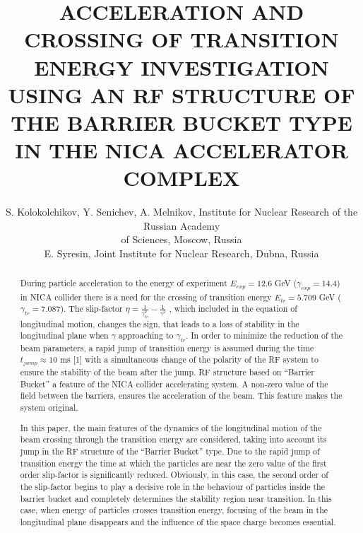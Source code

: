 \documentclass[a4paper,
               keeplastbox,   %
               ]{jacow}
\begin{document}
\title{ACCELERATION AND CROSSING OF TRANSITION ENERGY INVESTIGATION USING AN RF STRUCTURE OF THE BARRIER BUCKET TYPE IN THE NICA ACCELERATOR COMPLEX}

\author{S. Kolokolchikov, Y. Senichev, A. Melnikov, Institute for Nuclear Research of the Russian Academy \\of Sciences, Moscow, Russia\\
		E. Syresin, Joint Institute for Nuclear Research, Dubna, Russia\\}
	
\maketitle

%
\begin{abstract}
\par During particle acceleration  to the energy of experiment $E_{exp}=12.6$ GeV ($\gamma_{exp}=14.4$) in NICA collider there is a need for the crossing of transition energy  $E_{tr}=5.709$ GeV ($\gamma_{tr}=7.087$). The slip-factor $\eta=\frac{1}{\gamma_{tr}^2}-\frac{1}{\gamma^2}$ , which included in the equation of longitudinal motion, changes the sign, that leads to a loss of stability in the longitudinal plane when $\gamma$ approaching to $\gamma_{tr}$. In order to minimize the reduction of the beam parameters, a rapid jump of transition energy is assumed during the time $t_{jump}\approx10$ ms [1] with a simultaneous change of the polarity of the RF system to ensure the stability of the beam after the jump. RF structure based on “Barrier Bucket” a feature of the NICA collider accelerating system. A non-zero value of the field between the barriers, ensures the acceleration of the beam. This feature makes the system original.
\par In this paper, the main features of the dynamics of the longitudinal motion of the beam crossing through the transition energy are considered, taking into account its jump in the RF structure of the “Barrier Bucket” type. Due to the rapid jump of transition energy the time at which the particles are near the zero value of the first order slip-factor is significantly reduced.  Obviously, in this case, the second order of the slip-factor begins to play a decisive role in the behaviour of particles inside the barrier bucket and completely determines the stability region near transition. In this case, when energy of particles crosses transition energy, focusing of the beam in the longitudinal plane disappears and the influence of the space charge becomes essential.

\end{abstract}
\end{document}
